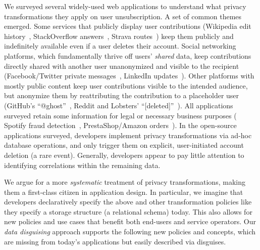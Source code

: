 %
We surveyed several widely-used web applications to understand what privacy transformations
they apply on user unsubscription.
%
A set of common themes emerged.
%
Some services that publicly display user contributions (\eg Wikipedia edit
history~\cite{wikipedia:privacy}, StackOverflow answers~\cite{stackoverflow:privacy},
Strava routes~\cite{strava:privacy}) keep them publicly and indefinitely available even if a user deletes
their account.
%
Social networking platforms, which fundamentally thrive off users' \emph{shared} data, keep
contributions directly shared with another user unanonymized and visible to the recipient
(\eg Facebook/Twitter private messages~\cite{facebook:privacy, twitter:privacy},
LinkedIn updates~\cite{linkedin:privacy}).
%
Other platforms with mostly public content keep user contributions visible to the intended
audience, but anonymize them by reattributing the contribution to a placeholder user
(\eg GitHub's ``@ghost''~\cite{github:privacy}, Reddit and Lobsters'
``[deleted]''~\cite{reddit:privacy, lobsters:privacy}).
%
%
All applications surveyed retain some information for legal or necessary business purposes (\eg
Spotify fraud detection~\cite{spotify:privacy}, PrestaShop/Amazon orders~\cite{amazon:privacy,
prestashop:privacy}).
%
In the open-source applications surveyed, developers implement privacy transformations
via ad-hoc database operations, and only trigger them on explicit, user-initiated account
deletion (a rare event).
%
Generally, developers appear to pay little attention to identifying correlations
within the remaining data.
%

%
We argue for a more \emph{systematic} treatment of privacy transformations, making them a
first-class citizen in application design.
%
In particular, we imagine that developers declaratively specify the above and other
transformation policies like they specify a storage structure (\eg a relational schema) today.
%
This also allows for new policies and use cases that benefit both end-users and service operators.
%
Our \emph{data disguising} approach supports the following new policies and concepts,
which are missing from today's applications but easily described via disguises.
%

